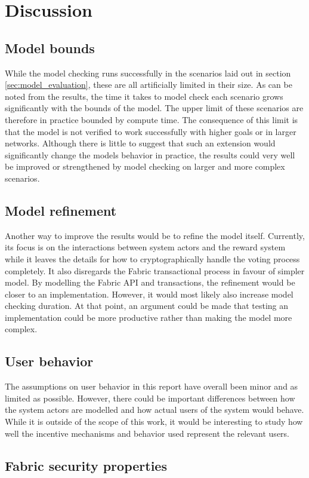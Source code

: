 \chapter{Discussion}
\label{ch:discussion}

\section{Model bounds}

While the model checking runs successfully in the scenarios laid out in section \ref{sec:model_evaluation}, these are all artificially limited in their size. As can be noted from the results, the time it takes to model check each scenario grows significantly with the bounds of the model. The upper limit of these scenarios are therefore in practice bounded by compute time. The consequence of this limit is that the model is not verified to work successfully with higher goals or in larger networks. Although there is little to suggest that such an extension would significantly change the models behavior in practice, the results could very well be improved or strengthened by model checking on larger and more complex scenarios.

\section{Model refinement}

Another way to improve the results would be to refine the model itself. Currently, its focus is on the interactions between system actors and the reward system while it leaves the details for how to cryptographically handle the voting process completely. It also disregards the Fabric transactional process in favour of simpler model. By modelling the Fabric API and transactions, the refinement would be closer to an implementation. However, it would most likely also increase model checking duration. At that point, an argument could be made that testing an implementation could be more productive rather than making the model more complex.


\section{User behavior}

The assumptions on user behavior in this report have overall been minor and as limited as possible. However, there could be important differences between how the system actors are modelled and how actual users of the system would behave. While it is outside of the scope of this work, it would be interesting to study how well the incentive mechanisms and behavior used represent the relevant users.

\section{Fabric security properties}


